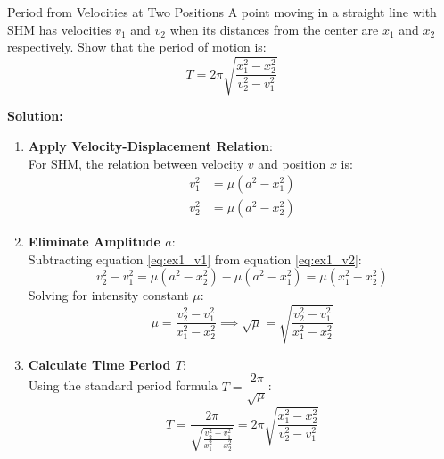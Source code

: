 \begin{examplebox}{Period from Velocities at Two Positions}
A point moving in a straight line with SHM has velocities $v_1$ and $v_2$ when its distances from the center are $x_1$ and $x_2$ respectively. Show that the period of motion is:
\begin{equation*}
    T = 2\pi \sqrt{\frac{x_1^2 - x_2^2}{v_2^2 - v_1^2}}
\end{equation*}

\tcblower
\textbf{Solution:}

\begin{enumerate}[leftmargin=1.5em]
    \item \textbf{Apply Velocity-Displacement Relation}:\\
    For SHM, the relation between velocity $v$ and position $x$ is:
    \begin{align}
        v_1^2 &= \mu (a^2 - x_1^2) \label{eq:ex1_v1} \\
        v_2^2 &= \mu (a^2 - x_2^2) \label{eq:ex1_v2}
    \end{align}
    
    \item \textbf{Eliminate Amplitude $a$}:\\
    Subtracting equation \eqref{eq:ex1_v1} from equation \eqref{eq:ex1_v2}:
    \begin{equation*}
        v_2^2 - v_1^2 = \mu(a^2 - x_2^2) - \mu(a^2 - x_1^2) = \mu(x_1^2 - x_2^2)
    \end{equation*}
    Solving for intensity constant $\mu$:
    \begin{equation*}
        \mu = \frac{v_2^2 - v_1^2}{x_1^2 - x_2^2} \implies \sqrt{\mu} = \sqrt{\frac{v_2^2 - v_1^2}{x_1^2 - x_2^2}}
    \end{equation*}
    
    \item \textbf{Calculate Time Period $T$}:\\
    Using the standard period formula $T = \dfrac{2\pi}{\sqrt{\mu}}$:
    \begin{equation*}
        T = \frac{2\pi}{\sqrt{\frac{v_2^2 - v_1^2}{x_1^2 - x_2^2}}} = 2\pi \sqrt{\frac{x_1^2 - x_2^2}{v_2^2 - v_1^2}}
    \end{equation*}
\end{enumerate}
\end{examplebox}

